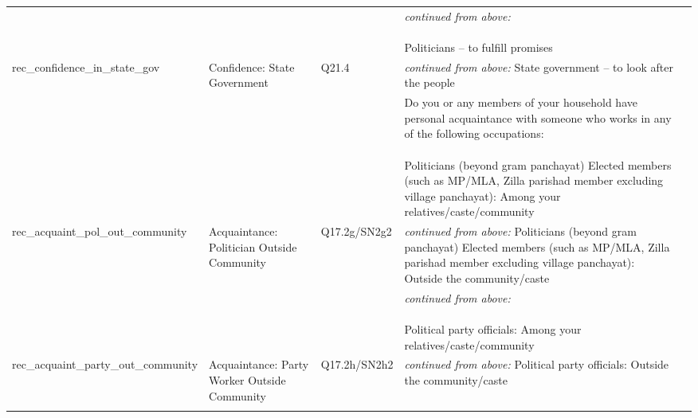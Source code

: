 \documentclass[
  11.5pt,
]{article}
\begin{document}
{\begin{landscape}
\begin{longtable}[t]{>{\raggedright\arraybackslash}p{16em}>{\raggedright\arraybackslash}p{6em}>{\raggedright\arraybackslash}p{7em}>{\raggedright\arraybackslash}p{18em}>{\raggedright\arraybackslash}p{18em}}
\cellcolor{gray!6}{rec\_confidence\_in\_pols} & \cellcolor{gray!6}{Confidence: Politicians} & \cellcolor{gray!6}{Q21.1} & \cellcolor{gray!6}{\textit{continued from above:} \newline \newline Politicians – to fulfill promises} & \cellcolor{gray!6}{}\\
rec\_confidence\_in\_state\_gov & Confidence: State Government & Q21.4 & \textit{continued from above:} \newline \newline State government – to look after the people & \\
\cellcolor{gray!6}{rec\_acquaint\_pol\_in\_community} & \cellcolor{gray!6}{Acquaintance: Politician in Community} & \cellcolor{gray!6}{Q17.2g/SN2g1} & \cellcolor{gray!6}{Do you or any members of your household have personal acquaintance with someone who works in any of the following occupations: \newline \newline  Politicians (beyond gram panchayat) Elected members (such as MP/MLA, Zilla parishad member excluding village panchayat): Among your relatives/caste/community} & \cellcolor{gray!6}{}\\
rec\_acquaint\_pol\_out\_community & Acquaintance: Politician Outside Community & Q17.2g/SN2g2 & \textit{continued from above:} \newline \newline Politicians (beyond gram panchayat) Elected members (such as MP/MLA, Zilla parishad member excluding village panchayat): Outside the community/caste & \\
\cellcolor{gray!6}{rec\_acquaint\_party\_in\_community} & \cellcolor{gray!6}{Acquaintance: Party Worker in Community} & \cellcolor{gray!6}{Q17.2h/SN2h1} & \cellcolor{gray!6}{\textit{continued from above:} \newline \newline Political party officials: Among your relatives/caste/community} & \cellcolor{gray!6}{}\\
rec\_acquaint\_party\_out\_community & Acquaintance: Party Worker Outside Community & Q17.2h/SN2h2 & \textit{continued from above:} \newline \newline Political party officials: Outside the community/caste & \\
\cellcolor{gray!6}{rec\_benefits\_income\_winsor} & \cellcolor{gray!6}{Winsorized Benefits Income} & \cellcolor{gray!6}{Q9.5, Q13, Q1-8 all government benefits INR} & \cellcolor{gray!6}{This variable is coded as ``INCBENEFITS'' in the codebook.} & \cellcolor{gray!6}{This variable measues the monetary sum of various government benefits respondents receive.}\\

\end{longtable}
\end{landscape}}
\end{document}
